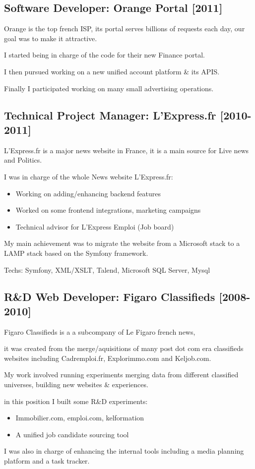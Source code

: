 \documentclass{article}
\begin{document}
\subsection*{Software Developer: Orange Portal [2011]}
Orange is the top french ISP, its portal serves billions of requests each day, our goal was to make it attractive.

I started being in charge of the code for their new Finance portal.

I then pursued working on a new unified account platform \& its APIS.

Finally I participated working on many small advertising operations.

\subsection*{Technical Project Manager: L'Express.fr [2010-2011]}
L'Express.fr is a major news website in France, it is a main source for Live news and Politics.

I was in charge of the whole News website L'Express.fr:

\begin{itemize}
\item Working on adding/enhancing backend features
\item Worked on some frontend integrations, marketing campaigns
\item Technical advisor for L’Express Emploi (Job board)
\end{itemize}
My main achievement was to migrate the website from a Microsoft stack to a LAMP stack based on the Symfony framework.

Techs: Symfony, XML/XSLT, Talend, Microsoft SQL Server, Mysql

\subsection*{R\&D Web Developer: Figaro Classifieds [2008-2010]}
Figaro Classifieds is a a subcompany of Le Figaro french news,

it was created from the merge/aquisitions of many post dot com era classifieds websites including Cadremploi.fr, Explorimmo.com and Keljob.com.


My work involved running experiments merging data from different classified universes, building new websites \& experiences.

in this position I built some R\&D experiments:

\begin{itemize}
\item Immobilier.com, emploi.com, kelformation
\item A unified job candidate sourcing tool
\end{itemize}
I was also in charge of enhancing the internal tools including a media planning platform and a task tracker.
\end{document}
